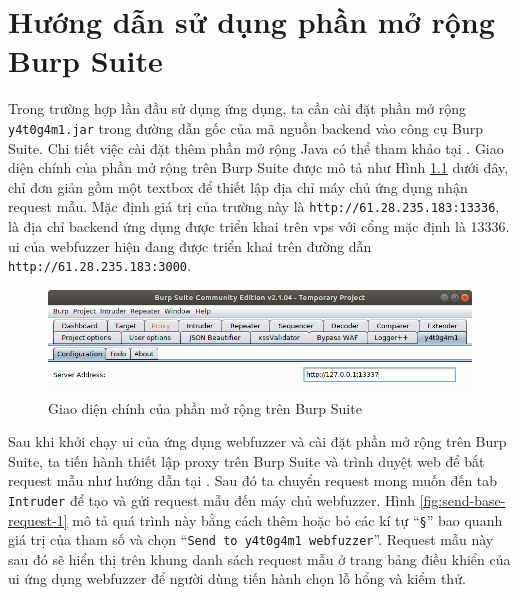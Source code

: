 \cleardoublepage
\appendix
\chapter{Hướng dẫn sử dụng phần mở rộng Burp Suite}
Trong trường hợp lần đầu sử dụng ứng dụng, ta cần cài đặt phần mở rộng \texttt{y4t0g4m1.jar} trong đường dẫn gốc của mã nguồn backend vào công cụ Burp Suite. Chi tiết việc cài đặt thêm phần mở rộng Java có thể tham khảo tại \parencite{burp-suite-extension-setup}. Giao diện chính của phần mở rộng trên Burp Suite được mô tả như Hình \ref{fig:main-burp-extension-interface} dưới đây, chỉ đơn giản gồm một textbox để thiết lập địa chỉ máy chủ ứng dụng nhận request mẫu. Mặc định giá trị của trường này là \texttt{http://61.28.235.183:13336}, là địa chỉ backend ứng dụng được triển khai trên \acrshort{vps} với cổng mặc định là 13336. \acrshort{ui} của webfuzzer hiện đang được triển khai trên đường dẫn \texttt{http://61.28.235.183:3000}.
\begin{figure}[H]
  \centering
    \includegraphics[width=\textwidth,keepaspectratio=true]{images/main-burp-extension-interface.png}
  \caption{Giao diện chính của phần mở rộng trên Burp Suite}
  \label{fig:main-burp-extension-interface}
\end{figure}
Sau khi khởi chạy \acrshort{ui} của ứng dụng webfuzzer và cài đặt phần mở rộng trên Burp Suite, ta tiến hành thiết lập proxy trên Burp Suite và trình duyệt web để bắt request mẫu như hướng dẫn tại \parencite{burp-suite-proxy}. Sau đó ta chuyển request mong muốn đến tab \texttt{Intruder} để tạo và gửi request mẫu đến máy chủ webfuzzer. Hình \ref{fig:send-base-request-1} mô tả quá trình này bằng cách thêm hoặc bỏ các kí tự ``\texttt{\S}'' bao quanh giá trị của tham số và chọn ``\texttt{Send to y4t0g4m1 webfuzzer}''. Request mẫu này sau đó sẽ hiển thị trên khung danh sách request mẫu ở trang bảng điều khiển của \acrshort{ui} ứng dụng webfuzzer để người dùng tiến hành chọn lỗ hổng và kiểm thử.